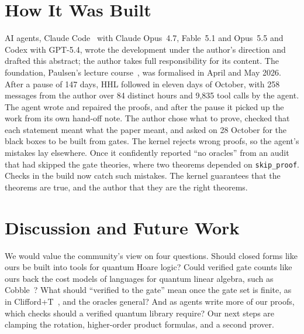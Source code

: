 \documentclass[acmsmall,nonacm,screen,11pt]{acmart}
\begin{document}
\section{How It Was Built}\label{sec:agent}

AI agents, Claude Code~\cite{claudecode} with Claude Opus~4.7, Fable~5.1 and Opus~5.5 and Codex with
GPT-5.4, wrote the development under the author's direction and drafted this abstract; the author takes
full responsibility for its content. The foundation, Paulsen's lecture
course~\cite{paulsen2011notes}, was formalised in April and May 2026. After a pause of 147 days, HHL
followed in eleven days of October, with 258 messages from the author over 84 distinct hours and
9{,}835 tool calls by the agent. The agent wrote and repaired the proofs, and after the pause it
picked up the work from its own hand-off note. The author chose what to prove, checked that each
statement meant what the paper meant, and asked on 28 October for the black boxes to be built from
gates. The kernel rejects wrong proofs, so the agent's mistakes lay elsewhere. Once it confidently
reported ``no oracles'' from an audit that had skipped the gate theories, where two theorems depended
on \texttt{skip\_proof}. Checks in the build now catch such mistakes. The kernel guarantees that the
theorems are true, and the author that they are the right theorems.

\section{Discussion and Future Work}

We would value the community's view on four questions. Should closed forms like ours be built into
tools for quantum Hoare logic? Could verified gate counts like ours back the cost models of languages
for quantum linear algebra, such as Cobble~\cite{yuan2026cobble}? What should
``verified to the gate'' mean once the gate set is finite, as in Clifford+T~\cite{ross2016gridsynth}, and the oracles general? And as agents write
more of our proofs, which checks should a verified quantum library require? Our next steps are clamping the rotation, higher-order product
formulas, and a second prover.



\end{document}
